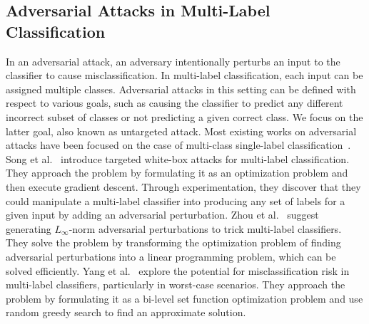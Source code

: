 \subsection{Adversarial Attacks in Multi-Label Classification}
In an adversarial attack, an adversary intentionally perturbs an input to the classifier to cause misclassification.
In multi-label classification, each input can be assigned multiple classes.
Adversarial attacks in this setting can be defined with respect to various goals, such as causing the classifier to predict any different incorrect subset of classes or not predicting a given correct class.
We focus on the latter goal, also known as untargeted attack.
Most existing works on adversarial attacks have been focused on the case of multi-class single-label classification~\cite{SINGLElABEL1, SINGLElABEL2, SINGLElABEL3, SINGLElABEL4}.
    Song et al.~\cite{MULTIlABEL1} introduce targeted white-box attacks for multi-label classification.
    They approach the problem by formulating it as an optimization problem and then execute gradient descent.
    Through experimentation, they discover that they could manipulate a multi-label classifier into producing any set of labels for a given input by adding an adversarial perturbation.
    Zhou et al.~\cite{MULTIlABEL2} suggest generating $L_{\infty}$-norm adversarial perturbations to trick multi-label classifiers.
    They solve the problem by transforming the optimization problem of finding adversarial perturbations into a linear programming problem, which can be solved efficiently.
    Yang et al.~\cite{MULTIlABEL3} explore the potential for misclassification risk in multi-label classifiers, particularly in worst-case scenarios.
    They approach the problem by formulating it as a bi-level set function optimization problem and use random greedy search to find an approximate solution.

